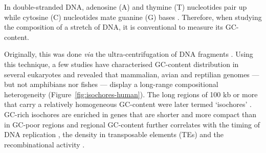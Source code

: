 %
%

In double-stranded DNA, adenosine (A) and thymine (T) nucleotides pair up while cytosine (C) nucleotides mate guanine (G) bases \citep[reviewed in \citealp{kresge2005chargaff}]{kresge2005chargaff}.
Therefore, when studying the composition of a stretch of DNA, it is conventional to measure its GC-content.

Originally, this was done \textit{via} the ultra-centrifugation of DNA fragments \citep{meselson1957equilibrium,corneo1968isolation}.
Using this technique, a few studies have characterised GC-content distribution in several eukaryotes \citep{filipski1973analysis,thiery1976analysis,macaya1976approach,macaya1978analysis,cortadas1977analysis} and revealed that mammalian, avian and reptilian genomes — but not amphibians nor fishes \citep{bernardi1990compositional} — display a long-range compositional heterogeneity (Figure~\ref{fig:isochores-human}).
The long regions of 100 kb or more that carry a relatively homogeneous GC-content were later termed ‘isochores’ \citep{cuny1981major}.\\


GC-rich isochores are enriched in genes \citep[reviewed in \citealp{bernardi2005distribution}]{bernardi1985mosaic,mouchiroud1991distribution,lander2001initial} that are shorter and more compact than in GC-poor regions \citep{duret1995statistical} and regional GC-content further correlates with the timing of DNA replication \citep{federico1998generichest,watanabe2002chromosomewide,costantini2008replication}, the density in transposable elements (TEs) \citep{smit1999interspersed,lander2001initial,mousegenomesequencingconsortium2002initial} and the recombinational activity \citep{fullerton2001local,kong2002highresolution}.\\



